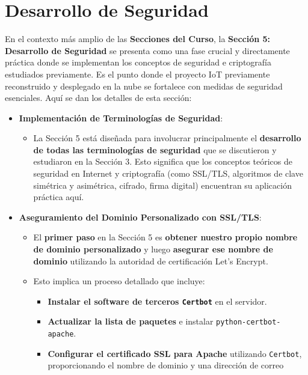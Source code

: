 \documentclass{report}
\begin{document}
\section{Desarrollo de Seguridad}
En el contexto más amplio de las \textbf{Secciones del Curso}, la \textbf{Sección 5: Desarrollo de Seguridad} se presenta como una fase crucial y 
directamente práctica donde se implementan los conceptos de seguridad e criptografía estudiados previamente. Es el punto donde el proyecto IoT 
previamente reconstruido y desplegado en la nube se fortalece con medidas de seguridad esenciales. Aquí se dan los detalles de esta sección:

\begin{itemize}
    \item \textbf{Implementación de Terminologías de Seguridad}:
    \begin{itemize}
        \item La Sección 5 está diseñada para involucrar principalmente el \textbf{desarrollo de todas las terminologías de seguridad} que se 
        discutieron y estudiaron en la Sección 3. Esto significa que los conceptos teóricos de seguridad en Internet y criptografía (como SSL/TLS, 
        algoritmos de clave simétrica y asimétrica, cifrado, firma digital) encuentran su aplicación práctica aquí.
    \end{itemize}
    \item \textbf{Aseguramiento del Dominio Personalizado con SSL/TLS}:
    \begin{itemize}
        \item El \textbf{primer paso} en la Sección 5 es \textbf{obtener nuestro propio nombre de dominio personalizado} y luego \textbf{asegurar 
        ese nombre de dominio} utilizando la autoridad de certificación Let's Encrypt.
        \item Esto implica un proceso detallado que incluye:
        \begin{itemize}
            \item \textbf{Instalar el software de terceros \texttt{Certbot}} en el servidor.
            \item \textbf{Actualizar la lista de paquetes} e instalar \texttt{python-certbot-apache}.
            \item \textbf{Configurar el certificado SSL para Apache} utilizando \texttt{Certbot}, proporcionando el nombre de dominio y una dirección 
            de correo
        \end{itemize}
    \end{itemize}

\end{itemize}
\end{document}
